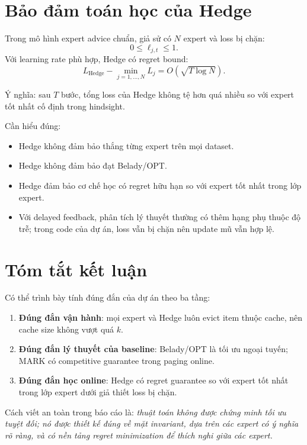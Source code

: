 \documentclass[11pt,a4paper]{article}
\begin{document}
\section{Bảo đảm toán học của Hedge}

Trong mô hình expert advice chuẩn, giả sử có \(N\) expert và loss bị chặn:
\[
    0\le \ell_{j,t}\le 1.
\]
Với learning rate phù hợp, Hedge có regret bound:
\[
    L_{\mathrm{Hedge}}
    -
    \min_{j=1,\ldots,N}L_j
    =
    O(\sqrt{T\log N}).
\]

Ý nghĩa: sau \(T\) bước, tổng loss của Hedge không tệ hơn quá nhiều so với expert tốt nhất cố định trong hindsight.

Cần hiểu đúng:

\begin{itemize}[leftmargin=1.4em]
    \item Hedge không đảm bảo thắng từng expert trên mọi dataset.
    \item Hedge không đảm bảo đạt Belady/OPT.
    \item Hedge đảm bảo cơ chế học có regret hữu hạn so với expert tốt nhất trong lớp expert.
    \item Với delayed feedback, phân tích lý thuyết thường có thêm hạng phụ thuộc độ trễ; trong code của dự án, loss vẫn bị chặn nên update mũ vẫn hợp lệ.
\end{itemize}

\section{Tóm tắt kết luận}

Có thể trình bày tính đúng đắn của dự án theo ba tầng:

\begin{enumerate}[leftmargin=1.4em]
    \item \textbf{Đúng đắn vận hành}: mọi expert và Hedge luôn evict item thuộc cache, nên cache size không vượt quá \(k\).
    \item \textbf{Đúng đắn lý thuyết của baseline}: Belady/OPT là tối ưu ngoại tuyến; MARK có competitive guarantee trong paging online.
    \item \textbf{Đúng đắn học online}: Hedge có regret guarantee so với expert tốt nhất trong lớp expert dưới giả thiết loss bị chặn.
\end{enumerate}

Cách viết an toàn trong báo cáo là: \emph{thuật toán không được chứng minh tối ưu tuyệt đối; nó được thiết kế đúng về mặt invariant, dựa trên các expert có ý nghĩa rõ ràng, và có nền tảng regret minimization để thích nghi giữa các expert.}
\end{document}
